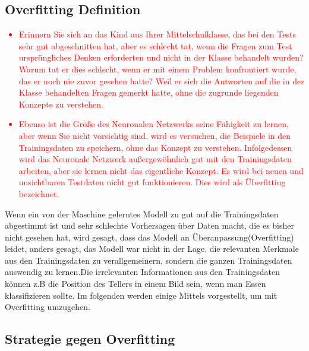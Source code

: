 \documentclass[12pt,a4paper]{scrartcl}
\numberwithin{equation}{section}
\begin{document}
 \subsection{Overfitting Definition}
 \textcolor{red}{\begin{itemize}
 		\item Erinnern Sie sich an das Kind aus Ihrer Mittelschulklasse, das bei den Tests sehr gut abgeschnitten hat, aber es schlecht tat, wenn die Fragen zum Test ursprüngliches Denken erforderten und nicht in der Klasse behandelt wurden? Warum tat er dies schlecht, wenn er mit einem Problem konfrontiert wurde, das er noch nie zuvor gesehen hatte? Weil er sich die Antworten auf die in der Klasse behandelten Fragen gemerkt hatte, ohne die zugrunde liegenden Konzepte zu verstehen.
 		\item Ebenso ist die Größe des Neuronalen Netzwerks seine Fähigkeit zu lernen, aber wenn Sie nicht vorsichtig sind, wird es versuchen, die Beispiele in den Trainingsdaten zu speichern, ohne das Konzept zu verstehen. Infolgedessen wird das Neuronale Netzwerk außergewöhnlich gut mit den Trainingsdaten arbeiten, aber sie lernen nicht das eigentliche Konzept. Es wird bei neuen und unsichtbaren Testdaten nicht gut funktionieren. Dies wird als Überfitting bezeichnet.
 	\end{itemize}
}
 Wenn ein von der Maschine gelerntes Modell zu gut auf die Trainingsdaten abgestimmt ist und sehr schlechte Vorhersagen über Daten macht, die es bisher nicht gesehen hat, wird gesagt, dass das Modell an Überanpassung(Overfitting) leidet, anders gesagt, das Modell war nicht in der Lage, die relevanten Merkmale aus den Trainingsdaten zu verallgemeinern, sondern die ganzen Trainingsdaten auswendig zu lernen.Die irrelevanten Informationen aus den Trainingsdaten können z.B die Position des Tellers in einem Bild sein, wenn man Essen klassifizieren sollte. Im folgenden werden einige Mittels vorgestellt, um mit Overfitting umzugehen.
 \subsection{Strategie gegen Overfitting}
\end{document}
